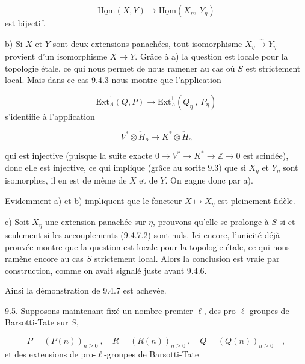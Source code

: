 \begin{equation*}
\underline{\mathrm{Hom}}(X,Y) \longrightarrow \underline{\mathrm{Hom}}(X_\eta,\ Y_\eta)
\end{equation*}
est bijectif.

b)  Si $X$ et $Y$ sont deux extensions panachées, tout isomorphisme $X_\eta \xrightarrow{\sim} Y_\eta$ provient d'un isomorphisme $X \longrightarrow Y$. Grâce à a) la question est locale pour la topologie étale, ce qui nous permet de nous ramener au cas où $S$ est strictement local. Mais dans ce cas 9.4.3 nous montre que l'application

\begin{equation*}
\mathrm{Ext}^1_\Lambda(Q,P) \longrightarrow \mathrm{Ext}^1_\Lambda(Q_\eta\ ,\ P_\eta)
\end{equation*}
s'identifie à l'application

\begin{equation*}
V^* \otimes \check{H}_o \longrightarrow K^* \otimes \check{H}_o
\end{equation*}



qui est injective (puisque la suite exacte $0 \longrightarrow V^* \longrightarrow K^* \longrightarrow \mathbb{Z} \longrightarrow 0$ est scindée), donc elle est injective, ce qui implique (grâce au sorite 9.3) que si $X_\eta$ et $Y_\eta$ sont isomorphes, il en est de même de $X$ et de $Y$. On gagne donc par a).

Evidemment a) et b) impliquent que le foncteur $X \longmapsto X_\eta$ est \underline{pleinement} fidèle.

c)  Soit $X_\eta$ une extension panachée sur $\eta$, prouvons qu'elle se prolonge à $S$ si et seulement si les accouplements (9.4.7.2) sont nuls. Ici encore, l'unicité déjà prouvée montre que la question est locale pour la topologie étale, ce qui nous ramène encore au cas $S$ strictement local. Alors la conclusion est vraie par construction, comme on avait signalé juste avant 9.4.6.

Ainsi la démonstration de 9.4.7 est achevée.

9.5.  Supposons maintenant fixé un nombre premier $\ell$, des pro-$\ell$-groupes de Barsotti-Tate sur $S$,

\begin{equation}\tag{9.5.1}
P = (P(n))_{n \geq 0} \ , \quad R = (R(n))_{n \geq 0} \ , \quad Q = (Q(n))_{n \geq 0} \quad ,
\end{equation}
et des extensions de pro-$\ell$-groupes de Barsotti-Tate

